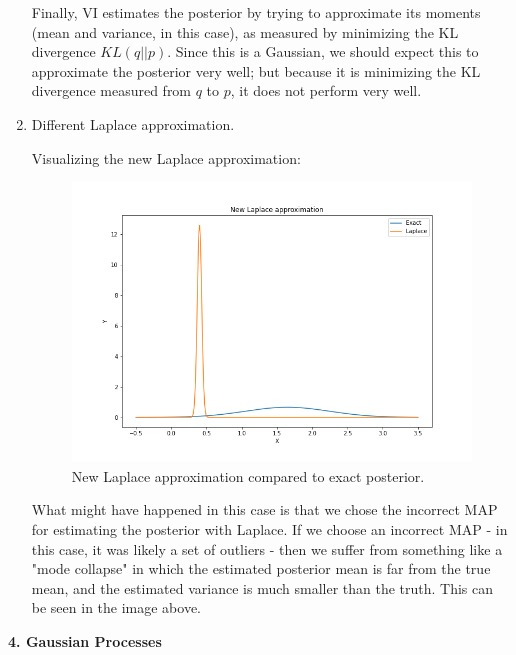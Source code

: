 \documentclass[11pt]{article}
\begin{document}
\begin{enumerate}[label=\textbf{\alph*.}]
        Finally, VI estimates the posterior by trying to approximate its moments (mean and variance, in this case), as measured by minimizing the KL divergence $KL(q||p)$. Since this is a Gaussian, we should expect this to approximate the posterior very well; but because it is minimizing the KL divergence measured from $q$ to $p$, it does not perform very well.

    \item Different Laplace approximation.

        Visualizing the new Laplace approximation:

        \begin{figure}[H]
            \centering
            \includegraphics[scale=0.45]{midterm_laplace.png}
            \caption{New Laplace approximation compared to exact posterior.}
        \end{figure}

        What might have happened in this case is that we chose the incorrect MAP for estimating the posterior with Laplace. If we choose an incorrect MAP - in this case, it was likely a set of outliers - then we suffer from something like a "mode collapse" in which the estimated posterior mean is far from the true mean, and the estimated variance is much smaller than the truth. This can be seen in the image above.

\end{enumerate}

\textbf{4. Gaussian Processes}
\end{document}
